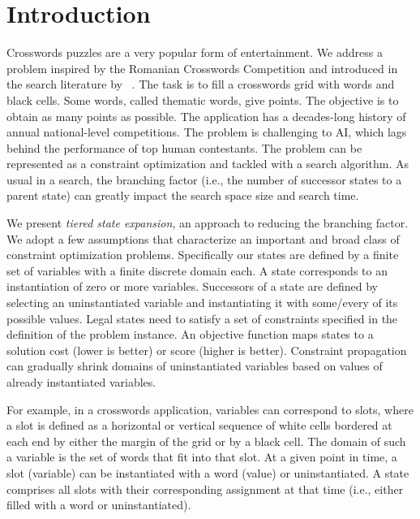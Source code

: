 \section{Introduction}
\label{sec::intro}


Crosswords puzzles are a very popular form of entertainment.
We address a problem
inspired by the Romanian Crosswords Competition and introduced in the search literature by
\citeauthor{DBLP:conf/socs/BoteaB21}~.
The task is to fill a crosswords grid with words and black cells.
Some words, called thematic words, give points. The objective
is to obtain as many points as possible.
The application has a decades-long history of annual national-level competitions.
The problem is challenging to AI, which lags 
behind the performance of top human contestants.
%
The problem can be represented as a constraint optimization and tackled with a search algorithm. As usual in a search, the branching factor
(i.e., the number of successor states to a parent state)
can greatly impact the search space size and search time.

We present {\em tiered state expansion}, an approach to reducing the branching factor.
We adopt a few assumptions that characterize 
an important and broad class of constraint optimization problems.
Specifically our states are defined by a finite set of variables with a finite discrete domain each. A  state corresponds to an instantiation of zero or more variables. Successors of a state are defined by selecting an uninstantiated variable and instantiating it with some/every of its possible values.
Legal states need to satisfy a set of constraints specified in the definition of the problem instance.
An objective function maps states to a solution cost (lower is better) or score (higher is better).
Constraint propagation can gradually shrink domains of uninstantiated variables based on  
values of already instantiated variables.

For example, in a crosswords application, variables can correspond to slots,
where a slot is defined as a horizontal or vertical sequence of white cells bordered
at each end by either the margin of the grid or by a black cell.
The domain of such a variable is the set of words that fit into that slot.
At a given point in time, a slot (variable) can be instantiated with a word (value) or uninstantiated.
A state comprises all slots with their corresponding assignment at that time (i.e., either 
filled with a word or uninstantiated).

